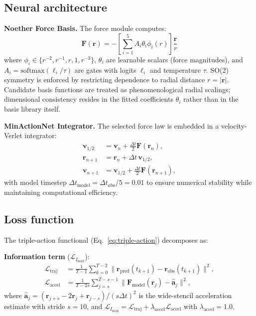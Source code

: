 \documentclass[aps,pre,reprint,superscriptaddress,longbibliography]{revtex4-2}
\begin{document}
\subsection{Neural architecture}
\textbf{Noether Force Basis.} The force module computes:
\begin{equation}
\mathbf{F}(\mathbf{r}) = -\left[\sum_{i=1}^5 A_i \theta_i \phi_i(r)\right] \frac{\mathbf{r}}{r}
\end{equation}
where $\phi_i \in \{r^{-2}, r^{-1}, r, 1, r^{-3}\}$, $\theta_i$ are learnable scalars (force magnitudes), and $A_i = \mathrm{softmax}(\ell_i / \tau)$ are gates with logits $\ell_i$ and temperature $\tau$. SO(2) symmetry is enforced by restricting dependence to radial distance $r = |\mathbf{r}|$. Candidate basis functions are treated as phenomenological radial scalings; dimensional consistency resides in the fitted coefficients $\theta_i$ rather than in the basis library itself.

\textbf{MinActionNet Integrator.} The selected force law is embedded in a velocity-Verlet integrator:
\begin{align}
\mathbf{v}_{1/2} &= \mathbf{v}_n + \tfrac{\Delta t}{2} \mathbf{F}(\mathbf{r}_n), \nonumber \\
\mathbf{r}_{n+1} &= \mathbf{r}_n + \Delta t \, \mathbf{v}_{1/2}, \\
\mathbf{v}_{n+1} &= \mathbf{v}_{1/2} + \tfrac{\Delta t}{2} \mathbf{F}(\mathbf{r}_{n+1}), \nonumber
\end{align}
with model timestep $\Delta t_{\text{model}} = \Delta t_{\text{obs}} / 5 = 0.01$ to ensure numerical stability while maintaining computational efficiency.

\subsection{Loss function}
The triple-action functional (Eq.~\ref{eq:triple-action}) decomposes as:

\textbf{Information term} ($\mathcal{L}_{I_{\max}}$):
\begin{align}
\mathcal{L}_{\text{traj}} &= \frac{1}{T-1} \sum_{k=0}^{T-2} \|\mathbf{r}_{\text{pred}}(t_{k+1}) - \mathbf{r}_{\text{obs}}(t_{k+1})\|^2, \\
\mathcal{L}_{\text{accel}} &= \frac{1}{T-2s} \sum_{j=s}^{T-s-1} \|\mathbf{F}_{\text{model}}(\mathbf{r}_j) - \hat{\mathbf{a}}_j\|^2,
\end{align}
where $\hat{\mathbf{a}}_j = (\mathbf{r}_{j+s} - 2\mathbf{r}_j + \mathbf{r}_{j-s}) / (s \Delta t)^2$ is the wide-stencil acceleration estimate with stride $s=10$, and $\mathcal{L}_{I_{\max}} = \mathcal{L}_{\text{traj}} + \lambda_{\text{accel}} \mathcal{L}_{\text{accel}}$ with $\lambda_{\text{accel}} = 1.0$.
\end{document}
